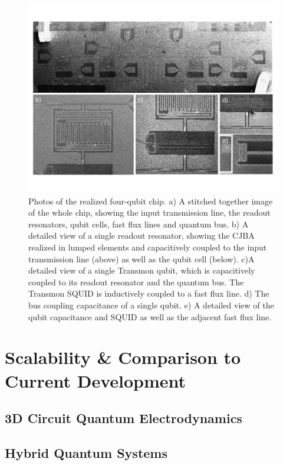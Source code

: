 \begin{figure}[ht!]
	\centering
	\includegraphics[width=\textwidth]{./material/figures/scalable-architecture/scalable_architecture_photos}
	\caption[]{Photos of the realized four-qubit chip. a) A stitched together image of the whole chip, showing the input transmission line, the readout resonators, qubit cells, fast flux lines and quantum bus. b) A detailed view of a single readout resonator, showing the CJBA realized in lumped elements and capacitively coupled to the input transmission line (above) as well as the qubit cell (below). c)A detailed view of a single Transmon qubit, which is capacitively coupled to its readout resonator and the quantum bus. The Transmon SQUID is inductively coupled to a fast flux line. d) The bus coupling capacitance of a single qubit. e) A detailed view of the qubit capacitance and SQUID as well as the adjacent fast flux line.}
	\label{fig:scalable_architecture_photos}
\end{figure}

\section{Scalability \& Comparison to Current Development}

\subsection{3D Circuit Quantum Electrodynamics}

\subsection{Hybrid Quantum Systems}
